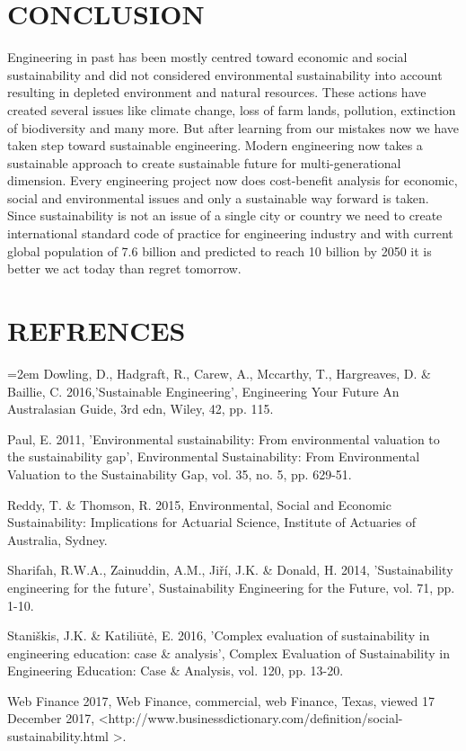 \documentclass{article}
\begin{document}
\section{CONCLUSION}\label{conclusion}
Engineering in past has been mostly centred toward economic and social sustainability and did not considered environmental sustainability into account resulting in depleted environment and natural resources. These actions have created several issues like climate change, loss of farm lands, pollution, extinction of biodiversity and many more. But after learning from our mistakes now we have taken step toward sustainable engineering. Modern engineering now takes a sustainable approach to create sustainable future for multi-generational dimension. Every engineering project now does cost-benefit analysis for economic, social and environmental issues and only a sustainable way forward is taken. Since sustainability is not an issue of a single city or country we need to create international standard code of practice for engineering industry and with current global population of 7.6 billion and predicted to reach 10 billion by 2050 it is better we act today than regret tomorrow.\pagebreak
\section{REFRENCES}\label{refrences}
\begin{flushleft}

\hangindent=2em
Dowling, D., Hadgraft, R., Carew, A., Mccarthy, T., Hargreaves, D. \& Baillie, C. 2016,'Sustainable Engineering', Engineering Your Future An Australasian Guide, 3rd edn, Wiley, 42, pp. 115.\linebreak

Paul, E. 2011, 'Environmental sustainability: From environmental valuation to the sustainability gap', Environmental Sustainability: From 
Environmental Valuation to the Sustainability Gap, vol. 35, no. 5, pp. 629-51.\linebreak


Reddy, T. \& Thomson, R. 2015, Environmental, Social and Economic Sustainability: Implications for Actuarial Science, Institute of Actuaries of Australia, Sydney.\linebreak


Sharifah, R.W.A., Zainuddin, A.M., Jiří, J.K. \& Donald, H. 2014, 'Sustainability engineering for the future', Sustainability Engineering for the Future, vol. 71, pp. 1-10.\linebreak


Staniškis, J.K. \& Katiliūtė, E. 2016, 'Complex evaluation of sustainability in engineering education: case \& analysis', Complex Evaluation of Sustainability in Engineering Education: Case \& Analysis, vol. 120, pp. 13-20.\linebreak


Web Finance 2017, Web Finance, commercial, web Finance, Texas, viewed 17 December 2017, \textless http://www.businessdictionary.com/definition/social-sustainability.html \textgreater.

\pagebreak
\end{flushleft}
\end{document}
